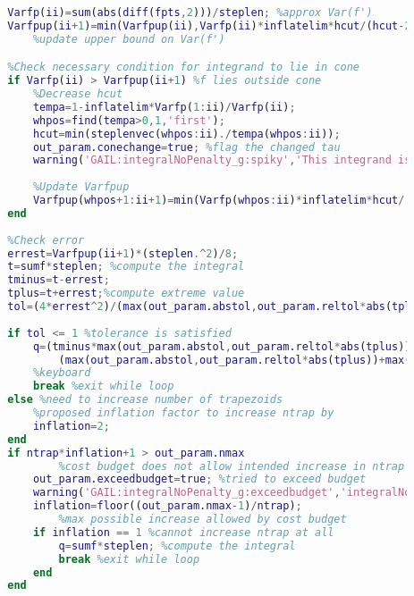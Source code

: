 \documentclass{iitthesis}
\begin{document}
\begin{lstlisting}[language=Matlab]
        %Compute approximation to Var(f')
        Varfp(ii)=sum(abs(diff(fpts,2)))/steplen; %approx Var(f')
        Varfpup(ii+1)=min(Varfpup(ii),Varfp(ii)*inflatelim*hcut/(hcut-2*steplen));
            %update upper bound on Var(f')       

        %Check necessary condition for integrand to lie in cone
        if Varfp(ii) > Varfpup(ii+1) %f lies outside cone
            %Decrease hcut
            tempa=1-inflatelim*Varfp(1:ii)/Varfp(ii);
            whpos=find(tempa>0,1,'first');
            hcut=min(steplenvec(whpos:ii)./tempa(whpos:ii));
            out_param.conechange=true; %flag the changed tau
            warning('GAIL:integralNoPenalty_g:spiky','This integrand is spiky relative to ninit. You may wish to increase ninit for similar integrands.');
            
            %Update Varfpup
            Varfpup(whpos+1:ii+1)=min(Varfp(whpos:ii)*inflatelim*hcut/(hcut-2*steplenvec(whpos:ii)));
        end
        
        %Check error
        errest=Varfpup(ii+1)*(steplen.^2)/8;
        t=sumf*steplen; %compute the integral
        tminus=t-errest; 
        tplus=t+errest;%compute extreme value
        tol=(4*errest^2)/(max(out_param.abstol,out_param.reltol*abs(tplus))+max(out_param.abstol,out_param.reltol*abs(tminus)))^2;%tolerance function
        
        if tol <= 1 %tolerance is satisfied
            q=(tminus*max(out_param.abstol,out_param.reltol*abs(tplus))+tplus*max(out_param.abstol,out_param.reltol*abs(tminus)))/...
                (max(out_param.abstol,out_param.reltol*abs(tplus))+max(out_param.abstol,out_param.reltol*abs(tminus)));
            %keyboard
            break %exit while loop
        else %need to increase number of trapezoids
            %proposed inflation factor to increase ntrap by
            inflation=2;
        end
        if ntrap*inflation+1 > out_param.nmax
                %cost budget does not allow intended increase in ntrap
            out_param.exceedbudget=true; %tried to exceed budget
            warning('GAIL:integralNoPenalty_g:exceedbudget','integralNoPenalty_g attempts to exceed the cost budget. The answer may be unreliable.');
            inflation=floor((out_param.nmax-1)/ntrap);
                %max possible increase allowed by cost budget
            if inflation == 1 %cannot increase ntrap at all
                q=sumf*steplen; %compute the integral                 
                break %exit while loop
            end
        end


\end{lstlisting}
\end{document}
